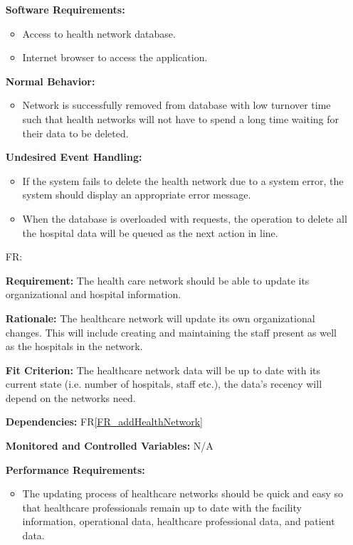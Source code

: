 \documentclass[12pt]{article}
\newcounter{reqnum} %
\begin{document}
\begin{itemize}
\textbf{Software Requirements:}
\begin{itemize}
  \item Access to health network database.
  \item Internet browser to access the application.
\end{itemize}

\textbf{Normal Behavior:}
\begin{itemize}
  \item Network is successfully removed from database with low turnover time such that health networks will not have to spend a long time waiting for their data to be deleted.
\end{itemize}

\textbf{Undesired Event Handling:}
\begin{itemize}
  \item If the system fails to delete the health network due to a system error, the system should display an appropriate error message. 
  \item When the database is overloaded with requests, the operation to delete all the hospital data will be queued as the next action in line.
\end{itemize}


\item[FR\refstepcounter{reqnum}\thereqnum \label{FR_UpdateHealthNetwork}:]

\textbf{Requirement:} The health care network should be able to update its organizational and hospital information.

\textbf{Rationale:} The healthcare network will update its own organizational changes. This will include creating and maintaining the staff present as well as the hospitals in the network.

\textbf{Fit Criterion:} The healthcare network data will be up to date with its current state (i.e. number of hospitals, staff etc.), the data’s recency will depend on the networks need. 

\textbf{Dependencies:} FR\ref{FR_addHealthNetwork}

\textbf{Monitored and Controlled Variables:} N/A

\textbf{Performance Requirements:} 
\begin{itemize}
  \item The updating process of healthcare networks should be quick and easy so that healthcare professionals remain up to date with the facility information, operational data, healthcare professional data, and patient data.
\end{itemize}


\end{itemize}
\end{document}
